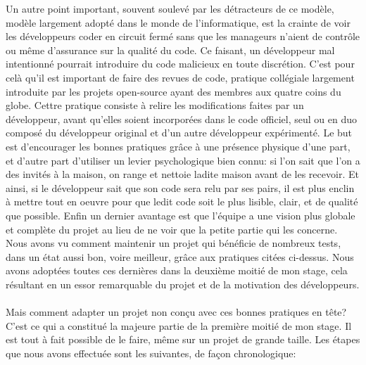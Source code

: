 \documentclass[a4paper,french,12pt]{article}
\begin{document}
	Un autre point important, souvent soulevé par les détracteurs de ce modèle, modèle largement adopté dans le monde de l'informatique, est la crainte de voir les développeurs coder en circuit fermé sans que les manageurs n'aient de contrôle ou même d'assurance sur la qualité du code. Ce faisant, un développeur mal intentionné pourrait introduire du code malicieux en toute discrétion.
	C'est pour celà qu'il est important de faire des revues de code, pratique collégiale largement introduite par les projets open-source ayant des membres aux quatre coins du globe.
	Cettre pratique consiste à relire les modifications faites par un développeur, avant qu'elles soient incorporées dans le code officiel, seul ou en duo composé du développeur original et d'un autre développeur expérimenté. Le but est d'encourager les bonnes pratiques grâce à une présence physique d'une part, et d'autre part d'utiliser un levier psychologique bien connu: si l'on sait que l'on a des invités à la maison, on range et nettoie ladite maison avant de les recevoir. Et ainsi, si le développeur sait que son code sera relu par ses pairs, il est plus enclin à mettre tout en oeuvre pour que ledit code soit le plus lisible, clair, et de qualité que possible. Enfin un dernier avantage est que l'équipe a une vision plus globale et complète du projet au lieu de ne voir que la petite partie qui les concerne.~\\
	
	Nous avons vu comment maintenir un projet qui bénéficie de nombreux tests, dans un état aussi bon, voire meilleur, grâce aux pratiques citées ci-dessus. Nous avons adoptées toutes ces dernières dans la deuxième moitié de mon stage, cela résultant en un essor remarquable du projet et de la motivation des développeurs. ~\\
	
	Mais comment adapter un projet non conçu avec ces bonnes pratiques en tête? C'est ce qui a constitué la majeure partie de la première moitié de mon stage. Il est tout à fait possible de le faire, même sur un projet de grande taille. Les étapes que nous avons effectuée sont les suivantes, de façon chronologique:~\\
	
\end{document}
